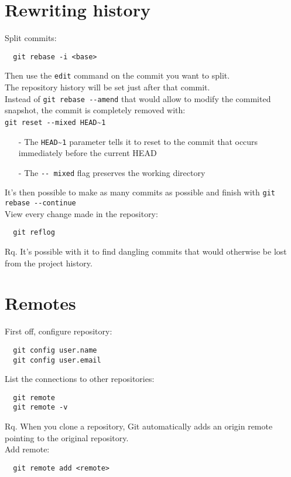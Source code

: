 \documentclass[french]{article}
\begin{document}
\section{Rewriting history}

Split commits:
\begin{verbatim}
  git rebase -i <base>
\end{verbatim}
Then use the \verb|edit| command on the commit you want to split.\\
The repository history will be set just after that commit.\\
Instead of \verb|git rebase --amend| that would allow to modify the commited snapshot, the commit is completely removed with: \\ \verb|git reset --mixed HEAD|\textasciitilde \verb|1|
\begin{itemize}
  \item [-] The \verb|HEAD|\textasciitilde \verb|1| parameter tells it to reset to the commit that occurs immediately before the current HEAD
  \item [-] The \verb|-- mixed| flag preserves the working directory
\end{itemize}
It's then possible to make as many commits as possible and finish with \verb|git rebase --continue|\\

View every change made in the repository:
\begin{verbatim}
  git reflog
\end{verbatim}
Rq. It's possible with it to find dangling commits that would otherwise be lost from the project history.

\section{Remotes}

First off, configure repository:
\begin{verbatim}
  git config user.name
  git config user.email
\end{verbatim}

List the connections to other repositories:
\begin{verbatim}
  git remote
  git remote -v
\end{verbatim}
Rq. When you clone a repository, Git automatically adds an origin remote pointing to the original repository. \\

Add remote:
\begin{verbatim}
  git remote add <remote>
\end{verbatim}
\end{document}
